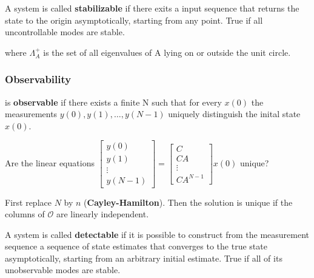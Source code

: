 \documentclass[8pt,a4paper]{scrartcl}
\begin{document}
\begin{multicols*}{3}

A system is called \textbf{stabilizable} if there exits a input sequence that returns the state to the origin asymptotically, starting from any point. True if all uncontrollable modes are stable.


where $\Lambda_A^+$ is the set of all eigenvalues of A lying on or outside the unit circle.

\subsubsection{Observability}


is \textbf{observable} if there exists a finite N such that for every $x(0)$ the measurements $y(0),y(1),\ldots,y(N-1)$ uniquely distinguish the inital state $x(0)$.

Are the linear equations $\begin{bmatrix}y(0)\\y(1)\\ \vdots\\y(N-1)\end{bmatrix}=\begin{bmatrix}C\\CA\\ \vdots\\CA^{N-1}\end{bmatrix}x(0)$ unique?


First replace $N$ by $n$ (\textbf{Cayley-Hamilton}). Then the solution is unique if the columns of $\mathcal{O}$ are linearly independent.

\finn

A system is called \textbf{detectable} if it is possible to construct from the measurement sequence a sequence of state estimates that converges to the true state asymptotically, starting from an arbitrary initial estimate. True if all of its unobservable modes are stable.



\end{multicols*}
\end{document}
